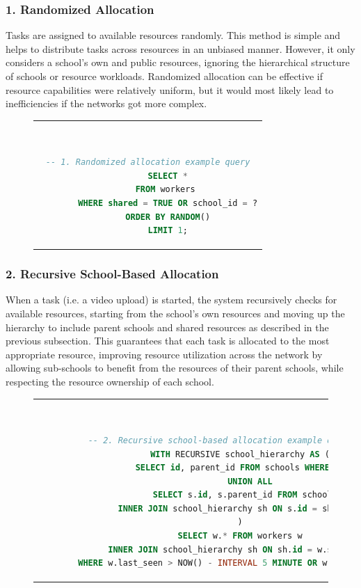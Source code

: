 \subsubsection{1. Randomized Allocation}
     Tasks are assigned to available resources randomly. This method is simple and helps to distribute tasks across resources in an unbiased manner. However, it only considers a school's own and public resources, ignoring the hierarchical structure of schools or resource workloads. Randomized allocation can be effective if resource capabilities were relatively uniform, but it would most likely lead to inefficiencies if the networks got more complex.

    \begin{figure}[htpb]
      \begin{tabular}{c}
      \ \small \begin{lstlisting}[language=SQL]
        -- 1. Randomized allocation example query
        SELECT *
        FROM workers 
        WHERE shared = TRUE OR school_id = ?
        ORDER BY RANDOM()
        LIMIT 1;
        \end{lstlisting}
      \end{tabular}
      \label{fig:randomized-allocation}
    \end{figure}
    
\subsubsection{2. Recursive School-Based Allocation}
    When a task (i.e. a video upload) is started, the system recursively checks for available resources, starting from the school's own resources and moving up the hierarchy to include parent schools and shared resources as described in the previous subsection. This guarantees that each task is allocated to the most appropriate resource, improving resource utilization across the network by allowing sub-schools to benefit from the resources of their parent schools, while respecting the resource ownership of each school.

    \begin{figure}[htpb]
      \begin{tabular}{c}
      \ \small \begin{lstlisting}[language=SQL]
        -- 2. Recursive school-based allocation example query
        WITH RECURSIVE school_hierarchy AS (
            SELECT id, parent_id FROM schools WHERE id = ?
            UNION ALL
            SELECT s.id, s.parent_id FROM schools s
            INNER JOIN school_hierarchy sh ON s.id = sh.parent_id
        )
        SELECT w.* FROM workers w
        INNER JOIN school_hierarchy sh ON sh.id = w.school_id
        WHERE w.last_seen > NOW() - INTERVAL 5 MINUTE OR w.shared = true;
        \end{lstlisting}
      \end{tabular}
      \label{fig:recursive-allocation}
    \end{figure}


